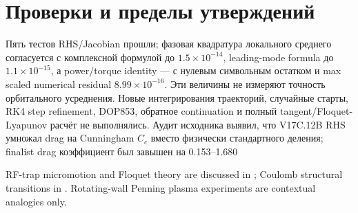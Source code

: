 \documentclass[11pt,a4paper]{article}
\begin{document}
\section{Проверки и пределы утверждений}
Пять тестов RHS/Jacobian прошли; фазовая квадратура локального среднего согласуется с комплексной формулой до \(1.5\times10^{-14}\), leading-mode formula до \(1.1\times10^{-15}\), а power/torque identity — с нулевым символьным остатком и max scaled numerical residual \(8.99\times10^{-16}\). Эти величины не измеряют точность орбитального усреднения. Новые интегрирования траекторий, случайные старты, RK4 step refinement, DOP853, обратное continuation и полный tangent/Floquet-Lyapunov расчёт не выполнялись. Аудит исходника выявил, что V17C.12B RHS умножал drag на Cunningham \(C_c\) вместо физически стандартного деления; finalist drag коэффициент был завышен на 0.153–1.680%

RF-trap micromotion and Floquet theory are discussed in \cite{Dehmelt1967Storage,Landa2012Modes,Kaufmann2012Eigenmodes}; Coulomb structural transitions in \cite{Dubin1993Structural,Fishman2008Structural}. Rotating-wall Penning plasma experiments \cite{Huang1997Steady,Huang1998PhaseLocked} are contextual analogies only.



\end{document}
